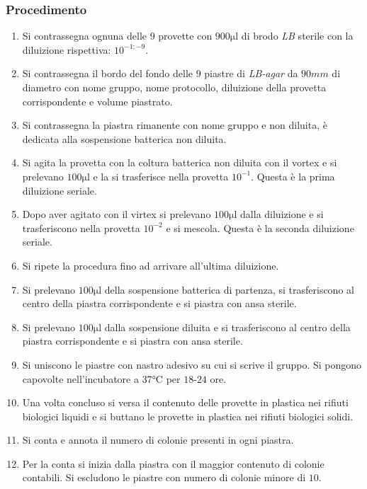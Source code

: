 		\subsubsection{Procedimento}
		\begin{enumerate}
			\item Si contrassegna ognuna delle $9$ provette con $900\si{\micro\litre}$ di brodo \emph{LB} sterile con la diluizione rispettiva: $10^{-1;-9}$.
			\item Si contrassegna il bordo del fondo delle $9$ piastre di \emph{LB-agar} da $90\si{mm}$ di diametro con nome gruppo, nome protocollo, diluizione della provetta corrispondente e volume piastrato.
			\item Si contrassegna la piastra rimanente con nome gruppo e non diluita, \`e dedicata alla sospensione batterica non diluita.
			\item Si agita la provetta con la coltura batterica non diluita con il vortex e si prelevano $100\si{\micro\litre}$ e la si trasferisce nella provetta $10^{-1}$.
				Questa \`e la prima diluizione seriale.
			\item Dopo aver agitato con il virtex si prelevano $100\si{\micro\litre}$ dalla diluizione e si trasferiscono nella provetta $10^{-2}$ e si mescola.
				Questa \`e la seconda diluizione seriale.
			\item Si ripete la procedura fino ad arrivare all'ultima diluizione.
			\item Si prelevano $100\si{\micro\litre}$ della sospensione batterica di partenza, si trasferiscono al centro della piastra corrispondente e si piastra con ansa sterile.
			\item Si prelevano $100\si{\micro\litre}$ dalla sospensione diluita e si trasferiscono al centro della piastra corrispondente e si piastra con ansa sterile.
			\item Si uniscono le piastre con nastro adesivo su cui si scrive il gruppo. 
				Si pongono capovolte nell'incubatore a $37\si{\celsius}$ per $18$-$24$ ore.
			\item Una volta concluso si versa il contenuto delle provette in plastica nei rifiuti biologici liquidi e si buttano le provette in plastica nei rifiuti biologici solidi.
			\item Si conta e annota il numero di colonie presenti in ogni piastra.
			\item Per la conta si inizia dalla piastra con il maggior contenuto di colonie contabili.
				Si escludono le piastre con numero di colonie minore di $10$.
		\end{enumerate}

